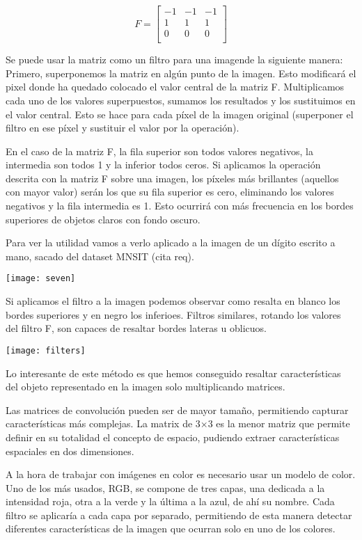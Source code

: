 \[
  F=
  \left[ {\begin{array}{ccc}
   -1 & -1 & -1 \\
   1 & 1 & 1 \\
   0 & 0 & 0 \\
  \end{array} } \right]
\]

Se puede usar la matriz como un filtro para una imagende la siguiente manera: Primero, superponemos la matriz en algún punto de la imagen. Esto modificará el pixel donde ha quedado colocado el valor central de la matriz F. Multiplicamos cada uno de los valores superpuestos, sumamos los resultados y los sustituimos en el valor central. Esto se hace para cada píxel de la imagen original (superponer el filtro en ese píxel y sustituir el valor por la operación).

En el caso de la matriz F, la fila superior son todos valores negativos, la intermedia son todos 1 y la inferior todos ceros. Si aplicamos la operación descrita con la matriz F sobre una imagen, los píxeles más brillantes (aquellos con mayor valor) serán los que su fila superior es cero, eliminando los valores negativos y la fila intermedia es 1. Esto ocurrirá con más frecuencia en los bordes superiores de objetos claros con fondo oscuro.

Para ver la utilidad vamos a verlo aplicado a la imagen de un dígito escrito a mano, sacado del dataset MNSIT (cita req).
\begin{center}
  \texttt{[image: seven]}
\end{center}

Si aplicamos el filtro a la imagen podemos observar como resalta en blanco los bordes superiores y en negro los inferioes. Filtros similares, rotando los valores del filtro F, son capaces de resaltar bordes lateras u oblicuos.

\begin{center}
  \texttt{[image: filters]}
\end{center}

Lo interesante de este método es que hemos conseguido resaltar características del objeto representado en la imagen solo multiplicando matrices.

Las matrices de convolución pueden ser de mayor tamaño, permitiendo capturar características más complejas. La matrix de 3$\times$3 es la menor matriz que permite definir en su totalidad el concepto de espacio, pudiendo extraer características espaciales en dos dimensiones.

A la hora de trabajar con imágenes en color es necesario usar un modelo de color. Uno de los más usados, RGB, se compone de tres capas, una dedicada a la intensidad roja, otra a la verde y la última a la azul, de ahí su nombre. Cada filtro se aplicaría a cada capa por separado, permitiendo de esta manera detectar diferentes características de la imagen que ocurran solo en uno de los colores.

